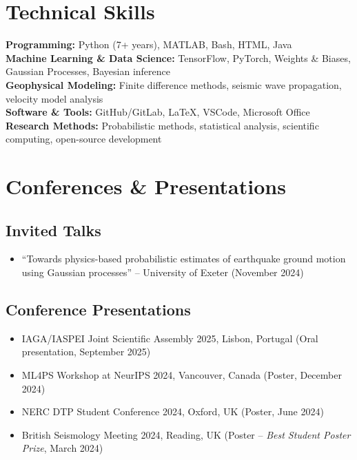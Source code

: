 \documentclass[11pt,a4paper]{article}
\begin{document}
\section*{Technical Skills}

\textbf{Programming:} Python (7+ years), MATLAB, Bash, HTML, Java\\
\textbf{Machine Learning \& Data Science:} TensorFlow, PyTorch, Weights \& Biases, Gaussian Processes, Bayesian inference\\
\textbf{Geophysical Modeling:} Finite difference methods, seismic wave propagation, velocity model analysis\\
\textbf{Software \& Tools:} GitHub/GitLab, LaTeX, VSCode, Microsoft Office\\
\textbf{Research Methods:} Probabilistic methods, statistical analysis, scientific computing, open-source development

\section*{Conferences \& Presentations}

\subsection*{Invited Talks}
\begin{itemize}
    \item ``Towards physics-based probabilistic estimates of earthquake ground motion using Gaussian processes'' -- University of Exeter (November 2024)
\end{itemize}

\subsection*{Conference Presentations}
\begin{itemize}
    \item IAGA/IASPEI Joint Scientific Assembly 2025, Lisbon, Portugal (Oral presentation, September 2025)
    \item ML4PS Workshop at NeurIPS 2024, Vancouver, Canada (Poster, December 2024)
    \item NERC DTP Student Conference 2024, Oxford, UK (Poster, June 2024)
    \item British Seismology Meeting 2024, Reading, UK (Poster -- \textit{Best Student Poster Prize}, March 2024)
\end{itemize}
\end{document}

